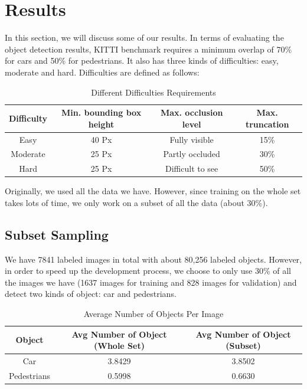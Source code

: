 \section{Results}

In this section, we will discuss some of our results.
In terms of evaluating the object detection results, KITTI benchmark requires a minimum overlap of 70\% for cars and 50\% for pedestrians. It also has three kinds of difficulties: easy, moderate and hard. Difficulties are defined as follows:

\begin{table}[h!]
\centering
\begin{tabular}{ c | c | c | c }
\hline
Difficulty & Min. bounding box height & Max. occlusion level & Max. truncation \\
\hline \hline
Easy & 40 Px & Fully visible & 15\% \\
Moderate & 25 Px & Partly occluded & 30\% \\
Hard & 25 Px & Difficult to see & 50\% \\
\hline
\end{tabular}
\caption{Different Difficulties Requirements}
\end{table}


Originally, we used all the data we have. 
However, since training on the whole set takes lots of time, 
we only work on a subset of all the data (about 30\%).

\subsection{Subset Sampling}
We have 7841 labeled images in total with about 80,256 labeled 
objects. However, in order to speed up the development process, 
we choose to only use 30\% of all the images we have (1637 images for training and 828 images for validation) and detect two 
kinds of object: car and pedestrians.

\begin{table}[h!]
\centering
\begin{tabular}{ c | c | c }
\hline
Object & Avg Number of Object (Whole Set) & Avg Number of Object (Subset)\\ 
\hline \hline
Car & 3.8429 & 3.8502\\
Pedestrians & 0.5998 & 0.6630\\
\hline
\end{tabular}
\caption{Average Number of Objects Per Image}
\end{table}

